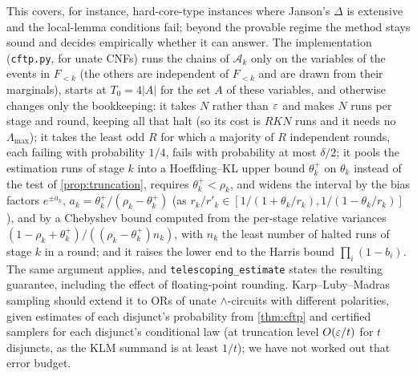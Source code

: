 This covers, for instance, hard-core-type instances where Janson's $\Delta$ is
extensive and the local-lemma conditions fail; beyond the provable regime the method
stays sound and decides empirically whether it can answer.
The implementation (\texttt{cftp.py}, for unate CNFs) runs the chains of
$\mathcal A_k$ only on the variables of the events in $F_{<k}$ (the others are
independent of $F_{<k}$ and are drawn from their marginals), starts at
$T_0=4|A|$ for the set $A$ of these variables, and otherwise changes only the
bookkeeping: it takes $N$ rather than $\varepsilon$ and makes $N$ runs per stage and round,
keeping all that halt (so its cost is $RKN$ runs and it needs no $\Lambda_{\max}$);
it takes the least odd $R$ for which a majority of $R$ independent rounds, each failing
with probability $1/4$, fails with probability at most $\delta/2$; it pools the
estimation runs of stage $k$ into a Hoeffding--KL upper bound $\theta_k^+$ on
$\theta_k$ instead of the test of \cref{prop:truncation}, requires $\theta_k^+<\rho_k$,
and widens the interval by the bias factors $e^{\pm a_k}$,
$a_k=\theta_k^+/(\rho_k-\theta_k^+)$ (as
$r_k/r'_k\in[1/(1+\theta_k/r_k),1/(1-\theta_k/r_k)]$), and by a Chebyshev bound
computed from the per-stage relative variances
$(1-\rho_k+\theta_k^+)/((\rho_k-\theta_k^+)n_k)$, with $n_k$ the least number of
halted runs of stage $k$ in a round; and it raises the lower end to the Harris bound
$\prod_i(1-b_i)$. The same argument applies, and \texttt{telescoping\_estimate} states
the resulting guarantee, including the effect of floating-point rounding. Karp--Luby--Madras
sampling should extend it to ORs of unate $\wedge$-circuits with different
polarities, given estimates of each disjunct's probability from \cref{thm:cftp} and
certified samplers for each disjunct's conditional law (at truncation level
$O(\varepsilon/t)$ for $t$ disjuncts, as the KLM summand is at least $1/t$); we have not
worked out that error budget.
